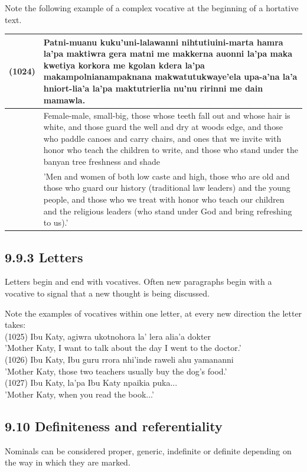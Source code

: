 \documentclass[10pt]{article}
\begin{document}
Note the following example of a complex vocative at the beginning of a hortative text.

\begin{center}
\begin{tabular}{|l|l|}
\hline
(1024) & Patni-muanu kuku'uni-lalawanni nihtutiuini-marta hamra la'pa maktiwra gera matni me makkerna auonni la'pa maka kwetiya korkora me kgolan kdera la'pa makampolnianampaknana makwatutukwaye'ela upa-a'na la'a hniort-lia'a la'pa maktutrierlia nu'nu ririnni me dain mamawla. \\
\hline
 & Female-male, small-big, those whose teeth fall out and whose hair is white, and those guard the well and dry at woods edge, and those who paddle canoes and carry chairs, and ones that we invite with honor who teach the children to write, and those who stand under the banyan tree freshness and shade \\
\hline
 & 'Men and women of both low caste and high, those who are old and those who guard our history (traditional law leaders) and the young people, and those who we treat with honor who teach our children and the religious leaders (who stand under God and bring refreshing to us).' \\
\hline
\end{tabular}
\end{center}

\subsection*{9.9.3 Letters}
Letters begin and end with vocatives. Often new paragraphs begin with a vocative to signal that a new thought is being discussed.

Note the examples of vocatives within one letter, at every new direction the letter takes:\\
(1025) Ibu Katy, agiwra ukotnohora la' lera alia'a dokter\\
'Mother Katy, I want to talk about the day I went to the doctor.'\\
(1026) Ibu Katy, Ibu guru rrora nhi'inde raweli ahu yamananni\\
'Mother Katy, those two teachers usually buy the dog's food.'\\
(1027) Ibu Katy, la’pa Ibu Katy npaikia puka...\\
'Mother Katy, when you read the book...'

\subsection*{9.10 Definiteness and referentiality}
Nominals can be considered proper, generic, indefinite or definite depending on the way in which they are marked.
\end{document}
